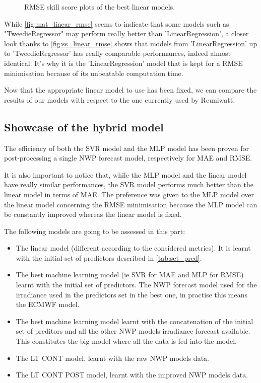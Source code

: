 \begin{figure}[htb!]
    \centering
    
\caption{RMSE skill score plots of the best linear models.}
\label{fig:ss_linear_rmse}
\end{figure}

While \autoref{fig:mat_linear_rmse} seems to indicate that some models such as "TweedieRegressor" may perform really better than 'LinearRegression', a closer look thanks to \autoref{fig:ss_linear_rmse} shows that models from 'LinearRegression' up to 'TweedieRegressor' has really comparable performances, indeed almost identical. It's why it is the 'LinearRegression' model that is kept for a RMSE minimisation because of its unbeatable computation time.

Now that the appropriate linear model to use has been fixed, we can compare the results of our models with respect to the one currently used by Reuniwatt.  
\subsection{Showcase of the hybrid model}
The efficiency of both the SVR model and the MLP model has been proven for post-processing a single NWP forecast model, respectively for MAE and RMSE.

It is also important to notice that, while the MLP model and the linear model have really similar performances, the SVR model performs much better than the linear model in terms of MAE.
The preference was given to the MLP model over the linear model concerning the RMSE minimisation because the MLP model can be constantly improved whereas the linear model is fixed.

The following models are going to be assessed in this part:
\begin{itemize}
    \item The linear model (different according to the considered metrics). It is learnt with the initial set of predictors described in \autoref{tab:set_pred}.
    \item The best machine learning model (ie SVR for MAE and MLP for RMSE) learnt with the initial set of predictors. The NWP forecast model used for the irradiance used in the predictors set in the best one, in practise this means the ECMWF model.
    \item The best machine learning model learnt with the concatenation of the initial set of preditors and all the other NWP models irradiance forecast available. This constitutes the big model where all the data is fed into the model.
    \item The LT CONT model, learnt with the raw NWP models data.
    \item The LT CONT POST model, learnt with the improved NWP models data.
\end{itemize}

